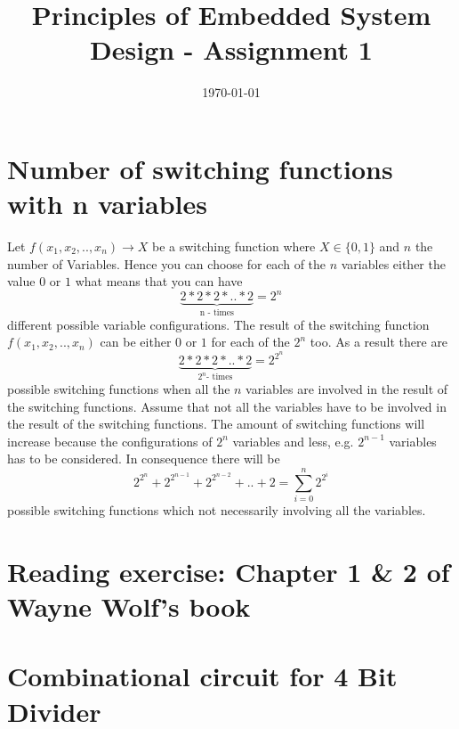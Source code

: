 \documentclass[a4paper,10pt]{scrartcl}
\title{Principles of Embedded System Design  - Assignment 1}
\author{\Authors}
\date{\today}
\begin{document}
\maketitle

\section{Number of switching functions with n variables}

Let  $ f(x_{1}, x_{2}, .. , x_{n}) \rightarrow X$ be a switching function where $X \in \{0,1\}$ and $n$ the number of Variables. Hence you can choose for each of the $n$ variables either the value $0$ or $1$ what means that you can have $$\underbrace{2*2*2* .. * 2}_\text{n - times}= 2^{n}$$ different possible variable configurations. The result of the switching function $ f(x_{1}, x_{2}, .. , x_{n})$ can be either $0$ or $1$ for each of the $2^{n}$ too. As a result there are $$\underbrace{2 * 2 * 2 * .. * 2}_{2^{n}\text{- times}} = 2 ^{2^{n}}$$ possible switching functions when all the $n$ variables are involved in the result of the switching functions. \newline \newline
Assume that not all the variables have to be involved in the result of the switching functions. The amount of switching functions will increase because the configurations of $2^{n}$ variables and less, e.g. $2^{n-1}$ variables has to be considered. In consequence there will be $$ 2 ^{2^{n}} + 2 ^{2^{n -1}} + 2 ^{2^{n -2}} + .. + 2 = \sum\limits_{i=0}^n 2 ^{2^{i}}$$ possible switching functions which not necessarily involving all the variables.

\section{Reading exercise: Chapter 1 \& 2 of Wayne Wolf’s book}

\section{Combinational circuit for 4 Bit Divider}
\end{document}
